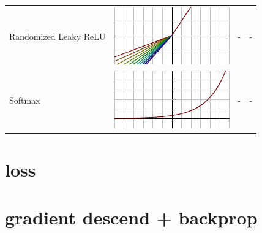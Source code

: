 \begin{tabular}{| p{25mm} | c | l | l |}
Randomized \newline Leaky ReLU & \begin{minipage}{.2\textwidth}
      \includegraphics[width=\textwidth]{tex/images/activation/rlrelu}
    \end{minipage} & - & -\\
    
Softmax & \begin{minipage}{.2\textwidth}
      \includegraphics[width=\textwidth]{tex/images/activation/softmax}
    \end{minipage} & -  & -\\
    
    
\hline

\end{tabular}

\section{loss}
\section{gradient descend + backprop}
